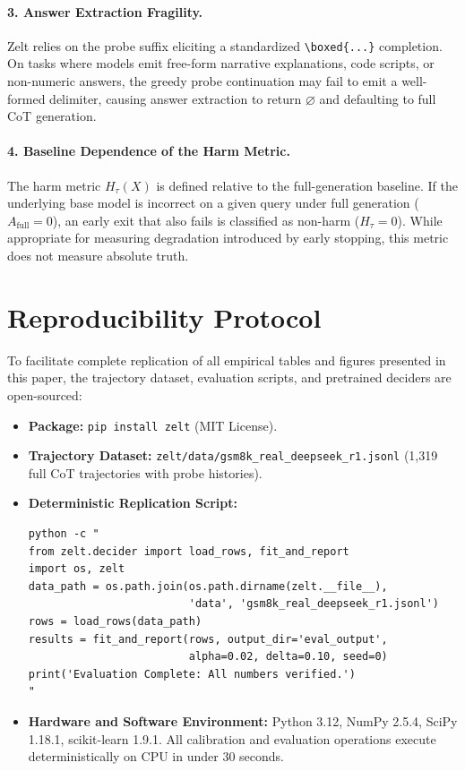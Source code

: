 \documentclass[11pt]{article}
\begin{document}
\paragraph{3. Answer Extraction Fragility.}
Zelt relies on the probe suffix eliciting a standardized \texttt{\textbackslash boxed\{...\}} completion. On tasks where models emit free-form narrative explanations, code scripts, or non-numeric answers, the greedy probe continuation may fail to emit a well-formed delimiter, causing answer extraction to return $\varnothing$ and defaulting to full CoT generation.

\paragraph{4. Baseline Dependence of the Harm Metric.}
The harm metric $H_\tau(X)$ is defined relative to the full-generation baseline. If the underlying base model is incorrect on a given query under full generation ($A_{\mathrm{full}}=0$), an early exit that also fails is classified as non-harm ($H_\tau=0$). While appropriate for measuring degradation introduced by early stopping, this metric does not measure absolute truth.

\section{Reproducibility Protocol}
\label{sec:reproducibility}

To facilitate complete replication of all empirical tables and figures presented in this paper, the trajectory dataset, evaluation scripts, and pretrained deciders are open-sourced:
\begin{itemize}
  \item \textbf{Package:} \texttt{pip install zelt} (MIT License).
  \item \textbf{Trajectory Dataset:} \texttt{zelt/data/gsm8k\_real\_deepseek\_r1.jsonl} (1{,}319 full CoT trajectories with probe histories).
  \item \textbf{Deterministic Replication Script:}
\begin{verbatim}
python -c "
from zelt.decider import load_rows, fit_and_report
import os, zelt
data_path = os.path.join(os.path.dirname(zelt.__file__),
                         'data', 'gsm8k_real_deepseek_r1.jsonl')
rows = load_rows(data_path)
results = fit_and_report(rows, output_dir='eval_output',
                         alpha=0.02, delta=0.10, seed=0)
print('Evaluation Complete: All numbers verified.')
"
\end{verbatim}
  \item \textbf{Hardware and Software Environment:} Python 3.12, NumPy 2.5.4, SciPy 1.18.1, scikit-learn 1.9.1. All calibration and evaluation operations execute deterministically on CPU in under 30 seconds.
\end{itemize}
\end{document}
